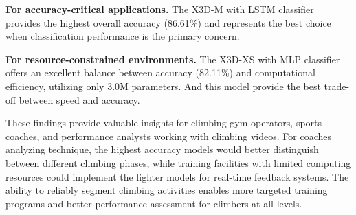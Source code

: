 \noindent\textbf{For accuracy-critical applications.}
The X3D-M with LSTM classifier provides the highest overall accuracy (86.61\%) and represents the best choice when classification performance is the primary concern.
    
\noindent\textbf{For resource-constrained environments.}
The X3D-XS with MLP classifier offers an excellent balance between accuracy (82.11\%) and computational efficiency, utilizing only 3.0M parameters. And this model provide the best trade-off between speed and accuracy.
    
These findings provide valuable insights for climbing gym operators, sports coaches, and performance analysts working with climbing videos. For coaches analyzing technique, the highest accuracy models would better distinguish between different climbing phases, while training facilities with limited computing resources could implement the lighter models for real-time feedback systems. The ability to reliably segment climbing activities enables more targeted training programs and better performance assessment for climbers at all levels.